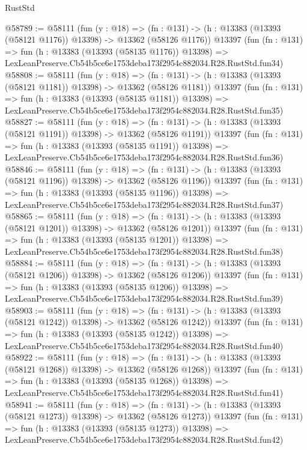 \begin{lexlean}{RustStd}
\begin{coremodule}
@58789 := @58111
    (fun (y : @18) =>
    (fn : @131) -> (h : @13383 (@13393 (@58121 @1176)) @13398) -> @13362 (@58126 @1176))
    @13397
    (fun (fn : @131) =>
    fun (h : @13383 (@13393 (@58135 @1176)) @13398) =>
    LexLeanPreserve.Cb54b5ce6e1753deba173f2954c882034.R28.RustStd.fun34)
@58808 := @58111
    (fun (y : @18) =>
    (fn : @131) -> (h : @13383 (@13393 (@58121 @1181)) @13398) -> @13362 (@58126 @1181))
    @13397
    (fun (fn : @131) =>
    fun (h : @13383 (@13393 (@58135 @1181)) @13398) =>
    LexLeanPreserve.Cb54b5ce6e1753deba173f2954c882034.R28.RustStd.fun35)
@58827 := @58111
    (fun (y : @18) =>
    (fn : @131) -> (h : @13383 (@13393 (@58121 @1191)) @13398) -> @13362 (@58126 @1191))
    @13397
    (fun (fn : @131) =>
    fun (h : @13383 (@13393 (@58135 @1191)) @13398) =>
    LexLeanPreserve.Cb54b5ce6e1753deba173f2954c882034.R28.RustStd.fun36)
@58846 := @58111
    (fun (y : @18) =>
    (fn : @131) -> (h : @13383 (@13393 (@58121 @1196)) @13398) -> @13362 (@58126 @1196))
    @13397
    (fun (fn : @131) =>
    fun (h : @13383 (@13393 (@58135 @1196)) @13398) =>
    LexLeanPreserve.Cb54b5ce6e1753deba173f2954c882034.R28.RustStd.fun37)
@58865 := @58111
    (fun (y : @18) =>
    (fn : @131) -> (h : @13383 (@13393 (@58121 @1201)) @13398) -> @13362 (@58126 @1201))
    @13397
    (fun (fn : @131) =>
    fun (h : @13383 (@13393 (@58135 @1201)) @13398) =>
    LexLeanPreserve.Cb54b5ce6e1753deba173f2954c882034.R28.RustStd.fun38)
@58884 := @58111
    (fun (y : @18) =>
    (fn : @131) -> (h : @13383 (@13393 (@58121 @1206)) @13398) -> @13362 (@58126 @1206))
    @13397
    (fun (fn : @131) =>
    fun (h : @13383 (@13393 (@58135 @1206)) @13398) =>
    LexLeanPreserve.Cb54b5ce6e1753deba173f2954c882034.R28.RustStd.fun39)
@58903 := @58111
    (fun (y : @18) =>
    (fn : @131) -> (h : @13383 (@13393 (@58121 @1242)) @13398) -> @13362 (@58126 @1242))
    @13397
    (fun (fn : @131) =>
    fun (h : @13383 (@13393 (@58135 @1242)) @13398) =>
    LexLeanPreserve.Cb54b5ce6e1753deba173f2954c882034.R28.RustStd.fun40)
@58922 := @58111
    (fun (y : @18) =>
    (fn : @131) -> (h : @13383 (@13393 (@58121 @1268)) @13398) -> @13362 (@58126 @1268))
    @13397
    (fun (fn : @131) =>
    fun (h : @13383 (@13393 (@58135 @1268)) @13398) =>
    LexLeanPreserve.Cb54b5ce6e1753deba173f2954c882034.R28.RustStd.fun41)
@58941 := @58111
    (fun (y : @18) =>
    (fn : @131) -> (h : @13383 (@13393 (@58121 @1273)) @13398) -> @13362 (@58126 @1273))
    @13397
    (fun (fn : @131) =>
    fun (h : @13383 (@13393 (@58135 @1273)) @13398) =>
    LexLeanPreserve.Cb54b5ce6e1753deba173f2954c882034.R28.RustStd.fun42)

\end{coremodule}
\end{lexlean}
